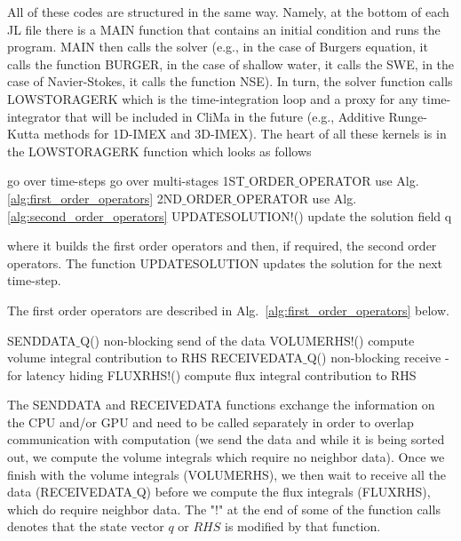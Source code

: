 \documentclass{article}
\begin{document}
All of these codes are structured in the same way.  Namely, at the bottom of each JL file there is a MAIN function that contains an initial condition and runs the program.  MAIN then calls the solver (e.g., in the case of Burgers equation, it calls the function BURGER, in the case of shallow water, it calls the SWE, in the case of Navier-Stokes, it calls the function NSE).  In turn, the solver function calls LOWSTORAGERK which is the time-integration loop and a proxy for any time-integrator that will be included in CliMa in the future (e.g., Additive Runge-Kutta methods for 1D-IMEX and 3D-IMEX).
The heart of all these kernels is in the LOWSTORAGERK function which looks as follows
\begin{algorithm}
\label{alg:Time-Stepper}
\begin{algorithmic}
 \Comment go over time-steps
 \Comment go over multi-stages
\State 1ST$\_$ORDER$\_$OPERATOR \Comment use Alg. \ref{alg:first_order_operators}
\State 2ND$\_$ORDER$\_$OPERATOR \Comment use Alg. \ref{alg:second_order_operators}
\EndIf
\State UPDATESOLUTION!() \Comment update the solution field q
\EndFor 
\EndFor
\EndFunction
\end{algorithmic}
\end{algorithm}
where it builds the first order operators and then, if required, the second order operators.  The function UPDATESOLUTION    updates the solution for the next time-step.  

The first order operators are described in Alg.\ \ref{alg:first_order_operators} below.
\begin{algorithm}
\label{alg:first_order_operators}
\begin{algorithmic}
\State SENDDATA$\_$Q() \Comment non-blocking send of the data
\State VOLUMERHS!() \Comment compute volume integral contribution to RHS
\State RECEIVEDATA$\_$Q() \Comment non-blocking receive - for latency hiding
\State FLUXRHS!() \Comment compute flux integral contribution to RHS
\EndFunction
\end{algorithmic}
\end{algorithm}
The SENDDATA and RECEIVEDATA functions exchange the information on the CPU and/or GPU and need to be called separately in order to overlap communication with computation (we send the data and while it is being sorted out, we compute the volume integrals which require no neighbor data).  Once we finish with the volume integrals (VOLUMERHS), we then wait to receive all the data (RECEIVEDATA$\_$Q) before we compute the flux integrals (FLUXRHS), which do require neighbor data. The "!" at the end of some of the function calls denotes that the state vector $q$ or $RHS$ is modified by that function.
\end{document}
